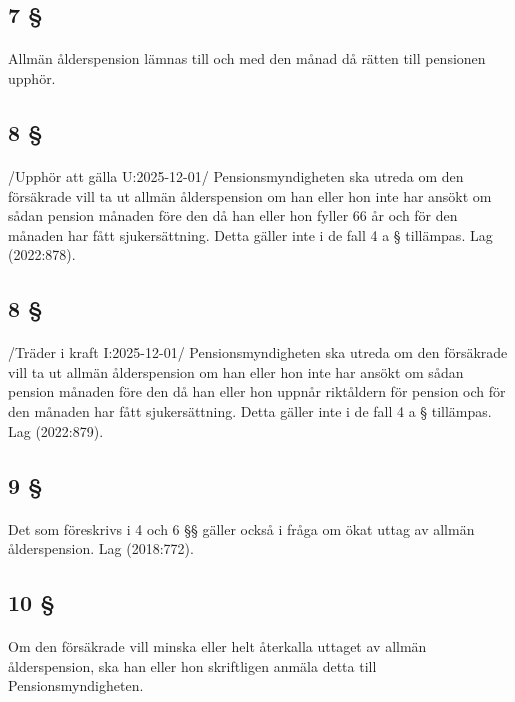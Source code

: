\documentclass[a4paper,notitlepage,openany,10pt]{book}
\begin{document}
\subsection*{7 §}
\paragraph*{}
Allmän ålderspension lämnas till och med den månad då rätten till pensionen upphör.
\subsection*{8 §}
\paragraph*{}
/Upphör att gälla U:2025-12-01/
Pensionsmyndigheten ska utreda om den försäkrade vill ta ut allmän ålderspension om han eller hon inte har ansökt om sådan pension månaden före den då han eller hon fyller 66 år och för den månaden har fått sjukersättning. Detta gäller inte i de fall 4 a § tillämpas.
Lag (2022:878).
\subsection*{8 §}
\paragraph*{}
/Träder i kraft I:2025-12-01/
Pensionsmyndigheten ska utreda om den försäkrade vill ta ut allmän ålderspension om han eller hon inte har ansökt om sådan pension månaden före den då han eller hon uppnår riktåldern för pension och för den månaden har fått sjukersättning. Detta gäller inte i de fall 4 a § tillämpas.
Lag (2022:879).
\subsection*{9 §}
\paragraph*{}
Det som föreskrivs i 4 och 6 §§ gäller också i fråga om ökat uttag av allmän ålderspension.
Lag (2018:772).
\subsection*{10 §}
\paragraph*{}
Om den försäkrade vill minska eller helt återkalla uttaget av allmän ålderspension, ska han eller hon skriftligen anmäla detta till Pensionsmyndigheten.
\end{document}
